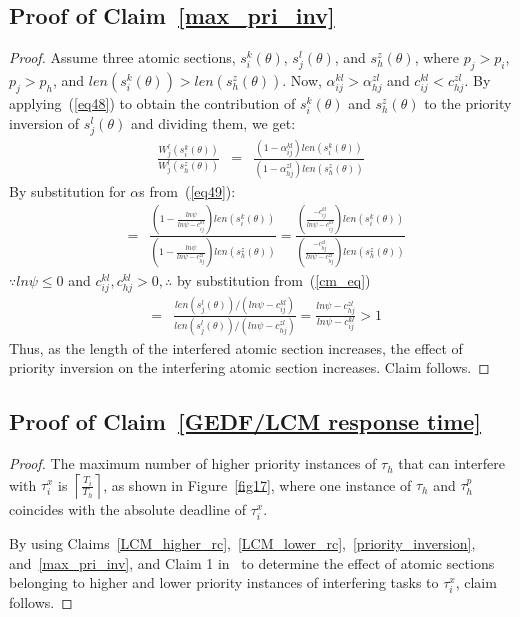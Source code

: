 \documentclass{sig-alternate}
\begin{document}
\subsection{\label{proof_max_pri_inv} Proof of Claim~\ref{max_pri_inv}}
\begin{proof}
Assume three atomic sections, $s_i^k(\theta)$, $s_j^l(\theta)$, and $s_h^z(\theta)$, where $p_j>p_i$, $p_j>p_h$, and $len(s_i^k(\theta))>len(s_h^z(\theta))$. Now, $\alpha_{ij}^{kl}>\alpha_{hj}^{zl}$ and $c_{ij}^{kl}<c_{hj}^{zl}$. By applying~(\ref{eq48}) to obtain the contribution of $s_i^k(\theta)$ and $s_h^z(\theta)$ to the priority inversion of $s_j^l(\theta)$ and dividing them, we get:
\begin{eqnarray*}
\frac{W_{j}^{l}(s_{i}^{k}(\theta))}{W_{j}^{l}(s_{h}^{z}(\theta))} & = & \frac{\left(1-\alpha_{ij}^{kl}\right)len(s_{i}^{k}(\theta))}{\left(1-\alpha_{hj}^{zl}\right)len(s_{h}^{z}(\theta))}
\end{eqnarray*}
By substitution for $\alpha$s from~(\ref{eq49}):
\begin{eqnarray*}
 & = & \frac{(1-\frac{ln\psi}{ln\psi-c_{ij}^{kl}})len(s_{i}^{k}(\theta))}{(1-\frac{ln\psi}{ln\psi-c_{hj}^{zl}})len(s_{h}^{z}(\theta))}
  =  \frac{(\frac{-c_{ij}^{kl}}{ln\psi-c_{ij}^{kl}})len(s_{i}^{k}(\theta))}{(\frac{-c_{hj}^{zl}}{ln\psi-c_{hj}^{zl}})len(s_{h}^{z}(\theta))}\end{eqnarray*}
$\because ln\psi \le 0$ and $c_{ij}^{kl},c_{hj}^{kl} > 0, \therefore$ by substitution from~(\ref{cm_eq})
\begin{eqnarray*}
 & = & \frac{len(s_{j}^{l}(\theta))/(ln\psi-c_{ij}^{kl})}{len(s_{j}^{l}(\theta))/(ln\psi-c_{hj}^{zl})}
  =  \frac{ln\psi-c_{hj}^{zl}}{ln\psi-c_{ij}^{kl}}>1\end{eqnarray*}
Thus, as the length of the interfered atomic section increases, the effect of priority inversion on the interfering atomic section increases. Claim follows.
\end{proof}
\subsection{\label{proof_GEDF/LCM response time}Proof of Claim~\ref{GEDF/LCM response time}}
\begin{proof}
The maximum number of higher priority instances of $\tau_h$ that can interfere with $\tau_i^x$ is $\left\lceil\frac{T_i}{T_h}\right\rceil$, as shown in Figure~\ref{fig17}, where one instance of $\tau_h$ and $\tau_h^p$ coincides with the absolute deadline of $\tau_i^x$.


By using Claims~\ref{LCM_higher_rc},~\ref{LCM_lower_rc},~\ref{priority_inversion}, and~\ref{max_pri_inv}, and Claim 1 in~\cite{stmconcurrencycontrol:emsoft11} to determine the effect of atomic sections belonging to higher and lower priority instances of interfering tasks to $\tau_i^x$, claim follows.
\end{proof}
\end{document}

